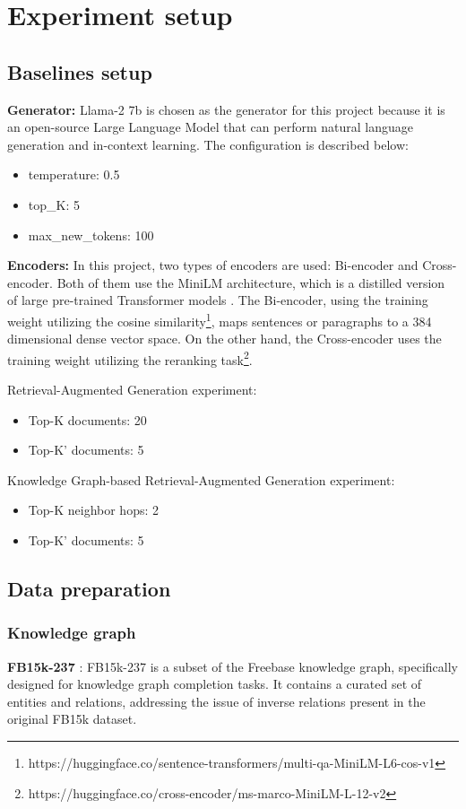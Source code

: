 \section{Experiment setup}
\subsection{Baselines setup}
\textbf{Generator:} Llama-2 7b \cite{touvron2023llama2} is chosen as the generator for this project because it is an open-source Large Language Model that can perform natural language generation and in-context learning. The configuration is described below:
\begin{itemize}
    \item temperature: 0.5
    \item top\_K: 5
    \item max\_new\_tokens: 100
\end{itemize}
\textbf{Encoders:} In this project, two types of encoders are used: Bi-encoder and Cross-encoder. Both of them use the MiniLM architecture, which is a distilled version of large pre-trained Transformer models \cite{wang2020minilm}. The Bi-encoder, using the training weight utilizing the cosine similarity\footnote{https://huggingface.co/sentence-transformers/multi-qa-MiniLM-L6-cos-v1}\cite{reimers-2019-sentence-bert}, maps sentences or paragraphs to a 384 dimensional dense vector space. On the other hand, the Cross-encoder uses the training weight utilizing the reranking task\footnote{https://huggingface.co/cross-encoder/ms-marco-MiniLM-L-12-v2}.\

Retrieval-Augmented Generation experiment:
\begin{itemize}
    \item Top-K documents: 20
    \item Top-K' documents: 5
\end{itemize}

Knowledge Graph-based Retrieval-Augmented Generation experiment:
\begin{itemize}
    \item Top-K neighbor hops: 2
    \item Top-K' documents: 5
\end{itemize}
\subsection{Data preparation}
\subsubsection{Knowledge graph}
\textbf{FB15k-237} \cite{toutanova-etal-2015-representing}: FB15k-237 is a subset of the Freebase knowledge graph, specifically designed for knowledge graph completion tasks. It contains a curated set of entities and relations, addressing the issue of inverse relations present in the original FB15k dataset.

